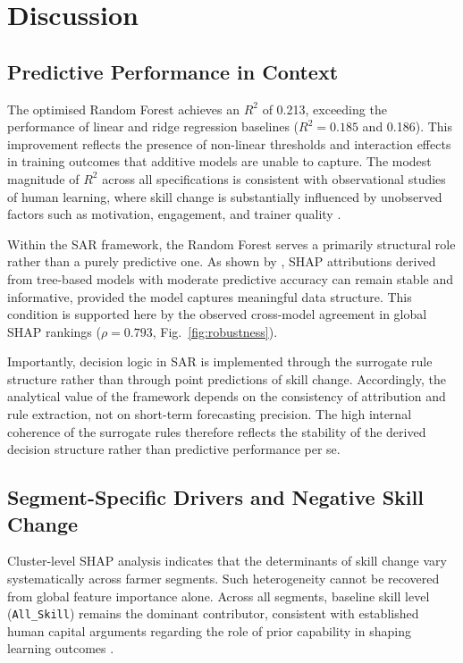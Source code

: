\documentclass[3p,twocolumn,authoryear]{elsarticle}
\begin{document}
\section{Discussion}

\subsection{Predictive Performance in Context}

The optimised Random Forest achieves an $R^{2}$ of 0.213, exceeding the
performance of linear and ridge regression baselines
($R^{2} = 0.185$ and 0.186).
This improvement reflects the presence of non-linear thresholds and
interaction effects in training outcomes that additive models are unable
to capture.
The modest magnitude of $R^{2}$ across all specifications is consistent
with observational studies of human learning, where skill change is
substantially influenced by unobserved factors such as motivation,
engagement, and trainer quality \citep{davis2012}.

Within the SAR framework, the Random Forest serves a primarily structural
role rather than a purely predictive one.
As shown by \citet{lundberg2020}, SHAP attributions derived from tree-based
models with moderate predictive accuracy can remain stable and
informative, provided the model captures meaningful data structure.
This condition is supported here by the observed cross-model agreement in
global SHAP rankings ($\rho = 0.793$, Fig.~\ref{fig:robustness}).

Importantly, decision logic in SAR is implemented through the surrogate
rule structure rather than through point predictions of skill change.
Accordingly, the analytical value of the framework depends on the
consistency of attribution and rule extraction, not on short-term
forecasting precision.
The high internal coherence of the surrogate rules therefore reflects the
stability of the derived decision structure rather than predictive
performance per se.

\subsection{Segment-Specific Drivers and Negative Skill Change}

Cluster-level SHAP analysis indicates that the determinants of skill
change vary systematically across farmer segments.
Such heterogeneity cannot be recovered from global feature importance
alone.
Across all segments, baseline skill level (\texttt{All\_Skill}) remains
the dominant contributor, consistent with established human capital
arguments regarding the role of prior capability in shaping learning
outcomes \citep{feder1985,davis2012}.
\end{document}
